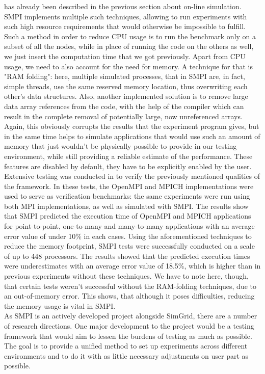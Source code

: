 has already been described in the previous section about on-line
simulation. SMPI implements multiple such techniques, allowing to run
experiments with such high resource requirements that would otherwise
be impossible to fulfill. Such a method in order to reduce CPU usage
is to run the
benchmark only on a subset of all the nodes, while in place of running
the code on the others as well, we just insert the computation time
that we got previously. Apart from CPU usage, we need to also account
for the need for memory. A technique for that is "RAM folding": here,
multiple simulated processes, that in SMPI are, in fact, simple
threads, use the same reserved memory location, thus overwriting each
other's data structures. Also, another implemented solution is to
remove large data array references from the code, with the help of the
compiler which can result in the complete removal of potentially
large, now unreferenced arrays. Again, this obviously corrupts the
results that the experiment program gives, but in the same time helps
to simulate applications that would use such an amount of memory that
just wouldn't be physically possible to provide in our testing
environment, while still providing a reliable estimate of the
performance.\cite{bdglmqssv13} These features are disabled by default,
they have to be explicitly enabled by the user.\\
Extensive testing was conducted in \cite{csgscq11} to verify the
previously mentioned qualities of the framework. In these tests, the
OpenMPI and MPICH implementations were used to serve as verification
benchmarks: the same experiments were run using both MPI
implementations, as well as simulated with SMPI. The
results show that SMPI predicted the execution time of OpenMPI and
MPICH applications for point-to-point, one-to-many and many-to-many
applications with an average error value of under 10\% in each
cases. Using the aforementioned techniques to reduce the memory
footprint, SMPI tests
were successfully conducted on a scale of up to 448 processors. The
results showed that the predicted execution times were
underestimates with an average error value of 18.5\%, which is higher
than in previous experiments without these techniques. We have to note
here, though, that
certain tests weren't successful without the RAM-folding techniques,
due to an out-of-memory error. This shows, that although it poses
difficulties, reducing the memory usage is vital in SMPI.\\
As SMPI is an actively developed project alongside SimGrid, there are
a number of research directions. One major development to the
project would be a testing framework that would aim to lessen the
burdens of testing as much as possible. The goal is to provide a
unified method to set up experiments across different environments and
to do it with as little necessary adjustments on user part as
possible.
